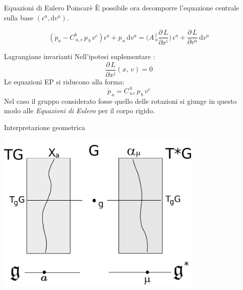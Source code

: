 \documentclass[unknownkeysallowed]{beamer}
\begin{document}
\begin{frame}{Equazioni di Eulero Poincarè}
È possibile ora decomporre l'equazione centrale sulla base $ (\epsilon^{a}, \textrm{d} v^{a})$.

\begin{displaymath}
(\dot{p}_{a} - C^{b}_{\: a, c} \, p_{\,b} \, v^{c}) \epsilon^{a} + p_{\,a}\, \textrm{d}v^{a} = \Bigr( A^{\, j}_{\: a}\dfrac{\partial \, L}{\partial x^{i}} \Bigr)\, \epsilon^{a} + \dfrac{\partial \, L}{\partial v^{a}}\, \textrm{d}v^{a}
\end{displaymath}
\vfill
{}



\end{frame}


\begin{frame}{Lagrangiane invarianti}
Nell’ipotesi suplementare :
\begin{displaymath}
\dfrac{\partial \, L}{\partial x^{j}}(x,\,v) = 0
\end{displaymath}
Le equazioni EP si riducono alla forma:
$$\dot{p}_{\,a} = C^{\: b}_{\, a \, c}\, p_{\,b} \, v^{c} $$
\vfill
Nel caso il gruppo considerato fosse quello delle rotazioni si giunge in questo modo alle \emph{Equazioni di Eulero} per il corpo rigido.

\end{frame}



\begin{frame}{Interpretazione geometrica} \begin{center} \includegraphics[width=10cm,keepaspectratio]{Fig/schemadoppiafibratura.pdf} \end{center} \end{frame}
\end{document}
